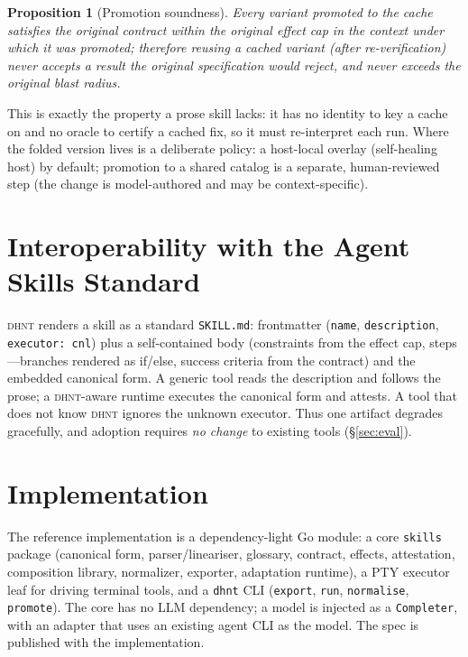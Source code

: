 \documentclass[11pt]{article}
\newcommand{\dhnt}{\textsc{dhnt}}
\newtheorem{proposition}{Proposition}
\begin{document}
\begin{proposition}[Promotion soundness]
Every variant promoted to the cache satisfies the original contract within the
original effect cap in the context under which it was promoted; therefore reusing
a cached variant (after re-verification) never accepts a result the original
specification would reject, and never exceeds the original blast radius.
\end{proposition}

This is exactly the property a prose skill lacks: it has no identity to key a
cache on and no oracle to certify a cached fix, so it must re-interpret each run.
Where the folded version lives is a deliberate policy: a host-local overlay
(self-healing host) by default; promotion to a shared catalog is a separate,
human-reviewed step (the change is model-authored and may be context-specific).

\section{Interoperability with the Agent Skills Standard}\label{sec:interop}

\dhnt{} renders a skill as a standard \texttt{SKILL.md}: frontmatter
(\texttt{name}, \texttt{description}, \texttt{executor: cnl}) plus a
self-contained body (constraints from the effect cap, steps---branches rendered
as if/else, success criteria from the contract) and the embedded canonical form.
A generic tool reads the description and follows the prose; a \dhnt{}-aware
runtime executes the canonical form and attests. A tool that does not know
\dhnt{} ignores the unknown executor. Thus one artifact degrades gracefully, and
adoption requires \emph{no change} to existing tools (\S\ref{sec:eval}).

\section{Implementation}\label{sec:impl}

The reference implementation is a dependency-light Go module: a core
\texttt{skills} package (canonical form, parser/lineariser, glossary, contract,
effects, attestation, composition library, normalizer, exporter, adaptation
runtime), a PTY executor leaf for driving terminal tools, and a \texttt{dhnt}
CLI (\texttt{export}, \texttt{run}, \texttt{normalise}, \texttt{promote}). The
core has no LLM dependency; a model is injected as a \texttt{Completer}, with an
adapter that uses an existing agent CLI as the model. The spec is published with
the implementation.
\end{document}
